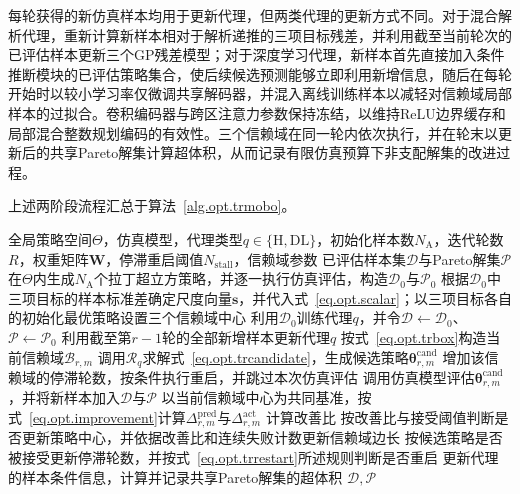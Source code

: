每轮获得的新仿真样本均用于更新代理，但两类代理的更新方式不同。对于混合解析代理，重新计算新样本相对于解析递推的三项目标残差，并利用截至当前轮次的已评估样本更新三个GP残差模型；对于深度学习代理，新样本首先直接加入条件推断模块的已评估策略集合，使后续候选预测能够立即利用新增信息，随后在每轮开始时以较小学习率仅微调共享解码器，并混入离线训练样本以减轻对信赖域局部样本的过拟合。卷积编码器与跨区注意力参数保持冻结，以维持ReLU边界缓存和局部混合整数规划编码的有效性。三个信赖域在同一轮内依次执行，并在轮末以更新后的共享Pareto解集计算超体积，从而记录有限仿真预算下非支配解集的改进过程。

上述两阶段流程汇总于算法~\ref{alg.opt.trmobo}。

\begin{algorithm}[H]
\caption{基于信赖域机制的多目标优化算法流程}\label{alg.opt.trmobo}
\begin{algorithmic}[1]
\REQUIRE 全局策略空间$\Theta$，仿真模型，代理类型$q\in\{\mathrm{H},\mathrm{DL}\}$，初始化样本数$N_{\mathrm A}$，迭代轮数$R$，权重矩阵$\bm W$，停滞重启阈值$N_{\mathrm{stall}}$，信赖域参数
\ENSURE 已评估样本集$\mathcal D$与Pareto解集$\mathcal P$
\STATE 在$\Theta$内生成$N_{\mathrm A}$个拉丁超立方策略，并逐一执行仿真评估，构造$\mathcal D_0$与$\mathcal P_0$
\STATE 根据$\mathcal D_0$中三项目标的样本标准差确定尺度向量$\bm s$，并代入式~\eqref{eq.opt.scalar}；以三项目标各自的初始化最优策略设置三个信赖域中心
\STATE 利用$\mathcal D_0$训练代理$q$，并令$\mathcal D\leftarrow\mathcal D_0$、$\mathcal P\leftarrow\mathcal P_0$
  \STATE 利用截至第$r-1$轮的全部新增样本更新代理$q$
    \STATE 按式~\eqref{eq.opt.trbox}构造当前信赖域$\mathcal B_{r,m}$
    \STATE 调用$\mathcal R_q$求解式~\eqref{eq.opt.trcandidate}，生成候选策略$\bm{\theta}_{r,m}^{\mathrm{cand}}$
      \STATE 增加该信赖域的停滞轮数，按条件执行重启，并跳过本次仿真评估
    \ELSE
      \STATE 调用仿真模型评估$\bm{\theta}_{r,m}^{\mathrm{cand}}$，并将新样本加入$\mathcal D$与$\mathcal P$
      \STATE 以当前信赖域中心为共同基准，按式~\eqref{eq.opt.improvement}计算$\Delta_{r,m}^{\mathrm{pred}}$与$\Delta_{r,m}^{\mathrm{act}}$
      \STATE 计算改善比
      \STATE 按改善比与接受阈值判断是否更新策略中心，并依据改善比和连续失败计数更新信赖域边长
      \STATE 按候选策略是否被接受更新停滞轮数，并按式~\eqref{eq.opt.trrestart}所述规则判断是否重启
    \ENDIF
  \ENDFOR
  \STATE 更新代理的样本条件信息，计算并记录共享Pareto解集的超体积
\ENDFOR
\RETURN $\mathcal D,\mathcal P$
\end{algorithmic}
\end{algorithm}

